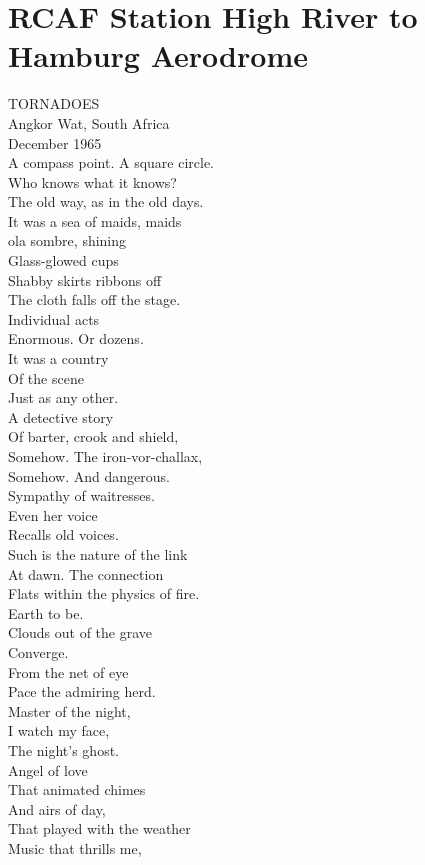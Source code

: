 \documentclass[smalldemyvopaper,11pt,twoside,onecolumn,openright,extrafontsizes]{memoir}
\begin{document}
\chapter{RCAF Station High River to Hamburg Aerodrome}
TORNADOES
\\Angkor Wat, South Africa
\\December 1965
\\A compass point. A square circle.
\\Who knows what it knows?
\\The old way, as in the old days.
\\It was a sea of maids, maids
\\ola sombre, shining
\\Glass-glowed cups
\\Shabby skirts ribbons off
\\The cloth falls off the stage.
\\Individual acts
\\Enormous. Or dozens.
\\It was a country
\\Of the scene
\\Just as any other.
\\A detective story
\\Of barter, crook and shield,
\\Somehow. The iron-vor-challax,
\\Somehow. And dangerous.
\\Sympathy of waitresses.
\\Even her voice
\\Recalls old voices.
\\Such is the nature of the link
\\At dawn. The connection
\\Flats within the physics of fire.
\\Earth to be.
\\Clouds out of the grave
\\Converge.
\\From the net of eye
\\Pace the admiring herd.
\\Master of the night,
\\I watch my face,
\\The night's ghost.
\\Angel of love
\\That animated chimes
\\And airs of day,
\\That played with the weather
\\Music that thrills me,
\end{document}
